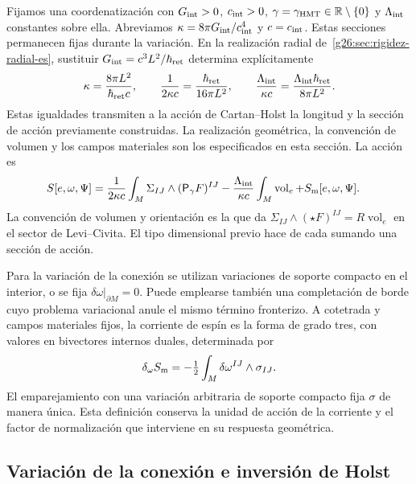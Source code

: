 Fijamos una coordenatización con \(G_{\rm int}>0\), \(c_{\rm int}>0\),
\(\gamma=\gamma_{\rm HMT}\in\mathbb R\setminus\{0\}\) y
\(\Lambda_{\rm int}\) constantes sobre ella. Abreviamos
\(\kappa=8\pi G_{\rm int}/c_{\rm int}^4\) y \(c=c_{\rm int}\).
Estas secciones permanecen fijas durante la variación. En la realización
radial de~\ref{g26:sec:rigidez-radial-es}, sustituir
\(G_{\rm int}=c^3L^2/\hbar_{\rm ret}\) determina explícitamente
\[
 \kappa=\frac{8\pi L^2}{\hbar_{\rm ret}c},\qquad
 \frac1{2\kappa c}=\frac{\hbar_{\rm ret}}{16\pi L^2},\qquad
 \frac{\Lambda_{\rm int}}{\kappa c}
   =\frac{\Lambda_{\rm int}\hbar_{\rm ret}}{8\pi L^2}.
\]
Estas igualdades transmiten a la acción de Cartan--Holst la longitud y
la sección de acción previamente construidas. La realización geométrica,
la convención de volumen y los campos materiales son los especificados
en esta sección. La acción es
\begin{equation}
 \begin{split}
 S[e,\omega,\Psi]={}&
 \frac1{2\kappa c}\int_M\Sigma_{IJ}\wedge
                         (\mathsf P_\gamma F)^{IJ}
 -\frac{\Lambda_{\rm int}}{\kappa c}
                         \int_M\operatorname{vol}_e
 +S_{\rm m}[e,\omega,\Psi].
 \end{split}
 \label{vii:eq:accion-cartan-holst}
\end{equation}
La convención de volumen y orientación es la que da
\(\Sigma_{IJ}\wedge(\star F)^{IJ}=R\operatorname{vol}_e\)
en el sector de Levi--Civita. El tipo dimensional previo hace de cada
sumando una sección de acción.

Para la variación de la conexión se utilizan variaciones de soporte
compacto en el interior, o se fija
\(\delta\omega|_{\partial M}=0\). Puede emplearse también una
completación de borde cuyo problema variacional anule el mismo término
fronterizo. A cotetrada y campos materiales fijos, la corriente de espín
es la forma de grado tres, con valores en bivectores internos duales,
determinada por
\begin{equation}
 \delta_\omega S_{\rm m}
 =-\tfrac12\int_M\delta\omega^{IJ}\wedge\sigma_{IJ}.
 \label{vii:eq:corriente-variacional}
\end{equation}
El emparejamiento con una variación arbitraria de soporte compacto fija
\(\sigma\) de manera única. Esta definición conserva la unidad de
acción de la corriente y el factor de normalización que interviene en
su respuesta geométrica.

\subsection{Variación de la conexión e inversión de Holst}
\label{vii:subsec:variacion-holst}

